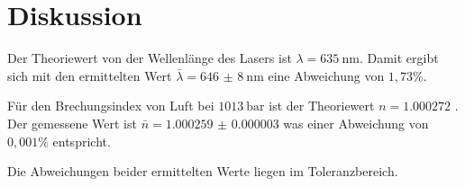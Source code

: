 \section{Diskussion}

Der Theoriewert von der Wellenlänge des Lasers ist $\lambda = \SI{635}{\nano\meter}$.
Damit ergibt sich mit den ermittelten Wert $\bar{\lambda} = \SI{646(8)}{\nano\meter}$
eine Abweichung von $1,73 \%$.

Für den Brechungsindex von Luft bei $\SI{1013}{\bar}$ ist der Theoriewert $n = \num{1.000272}$ \cite{2}.
Der gemessene Wert ist $\bar{n} = \num{1.000259(3)}$ was einer Abweichung von
$0,001 \%$ entspricht.

Die Abweichungen beider ermittelten Werte liegen im Toleranzbereich.
